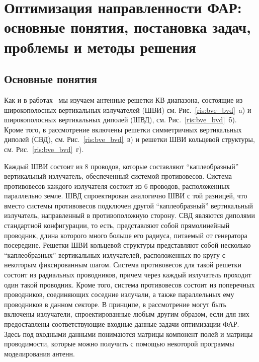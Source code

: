 \chapter{Оптимизация направленности ФАР: основные понятия, постановка задач, проблемы и методы решения}\label{ch:ch1}

\section{Основные понятия}

Как и в работах~\cite{yurkov:groundloss,yurkov:knd} мы изучаем антенные решетки КВ диапазона, состоящие из широкополосных вертикальных
излучателей (ШВИ) см. Рис.~\ref{ris:bve_bvd}~a) и широкополосных вертикальных диполей (ШВД), см. Рис.~\ref{ris:bve_bvd}~б). Кроме того, в
рассмотрение включены решетки симметричных вертикальных диполей (СВД), см. Рис.~\ref{ris:bve_bvd}~в) и решетки ШВИ кольцевой структуры, см. Рис.~\ref{ris:bve_bvd}~г).

Каждый ШВИ состоит из 8 проводов, которые составляют ``каплеобразный'' вертикальный излучатель, обеспеченный системой противовесов.
Система противовесов каждого излучателя состоит из 6 проводов, расположенных параллельно земле. ШВД спроектирован аналогично ШВИ с той
разницей, что вместо системы противовесов подключен другой ``каплеобразный'' вертикальный излучатель, направленный в противоположную сторону. СВД являются диполями стандартной конфигурации, то есть, представляют собой прямолинейный проводник, длина которого много
больше его радиуса, питаемый от генератора посередине. Решетки ШВИ кольцевой структуры представляют собой несколько ``каплеобразных''
вертикальных излучателей, расположенных по кругу с некоторым фиксированным шагом. Система противовесов для такой решетки состоит из
радиальных проводников, причем через каждый излучатель проходит один такой проводник. Кроме того, система противовесов состоит из поперечных проводников, соединяющих соседние излучали, а также параллельных ему проводников в данном секторе. В принципе, в рассмотрение могут быть включены излучатели, спроектированные любым другим образом, если для них предоставлены соответствующие входные данные задачи оптимизации ФАР. Здесь под входными данными понимаются матрицы компонент полей и матрицы проводимости, которые можно получить с помощью некоторой программы моделирования антенн.

